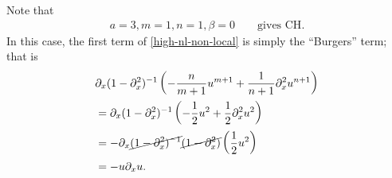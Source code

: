 \documentclass[12pt,reqno]{amsart}
\numberwithin{equation}{section}  %
\numberwithin{figure}{section}
\newcommand{\p}{\partial}
\theoremstyle{plain}
\theoremstyle{definition}
\theoremstyle{remark}
\begin{document}
%
%
Note that 
%
%
\begin{equation*}
	\begin{split}
		a=3, m=1, n=1, \beta=0 \qquad \text{gives CH}.
	\end{split}
\end{equation*}
%
%
In this case, the first term of \eqref{high-nl-non-local} is simply the 
``Burgers'' term; that is
%
%
\begin{equation*}
	\begin{split}
		& \p_x (1-\p_x^2)^{-1} \left( -\frac{n}{m+1} u^{m+1} + \frac{1}{n+1}
		\p_x^{2}u^{n+1} \right)
		\\
		& = \p_x (1-\p_x^2)^{-1} \left( -\frac{1}{2}u^{2} + \frac{1}{2} \p_x^2 u^{2} \right)
		\\
		& = -\p_x \cancel{(1-\p_x^2)^{-1}} \cancel{(1-\p_x^2)} \left( \frac{1}{2}u^{2} \right) 
		\\
		& = -u \p_x u.
	\end{split}
\end{equation*}
%
%




									
\end{document}
